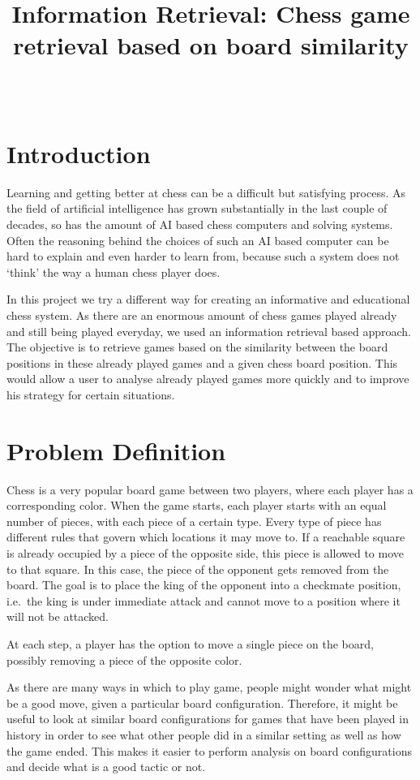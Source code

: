 \documentclass[11pt]{article}
\title{Information Retrieval: Chess game retrieval based on board similarity}
\author{\studentA \\ \studentB}
\begin{document}
    \maketitle


    \section{Introduction}

    Learning and getting better at chess can be a difficult but satisfying process. As the field of artificial intelligence has grown substantially in the last couple of decades, so has the amount of AI based chess computers and solving systems. Often the reasoning behind the choices of such an AI based computer can be hard to explain and even harder to learn from, because such a system does not `think' the way a human chess player does.

    In this project we try a different way for creating an informative and educational chess system. As there are an enormous amount of chess games played already and still being played everyday, we used an information retrieval based approach. The objective is to retrieve games based on the similarity between the board positions in these already played games and a given chess board position. This would allow a user to analyse already played games more quickly and to improve his strategy for certain situations.


    \section{Problem Definition}

    Chess is a very popular board game between two players, where each player has a corresponding color. When the game starts, each player starts with an equal number of pieces, with each piece of a certain type. Every type of piece has different rules that govern which locations it may move to. If a reachable square is already occupied by a piece of the opposite side, this piece is allowed to move to that square. In this case, the piece of the opponent gets removed from the board. The goal is to place the king of the opponent into a checkmate position, i.e.\ the king is under immediate attack and cannot move to a position where it will not be attacked.

    At each step, a player has the option to move a single piece on the board, possibly removing a piece of the opposite color.

    As there are many ways in which to play game, people might wonder what might be a good move, given a particular board configuration. Therefore, it might be useful to look at similar board configurations for games that have been played in history in order to see what other people did in a similar setting as well as how the game ended. This makes it easier to perform analysis on board configurations and decide what is a good tactic or not.
\end{document}
